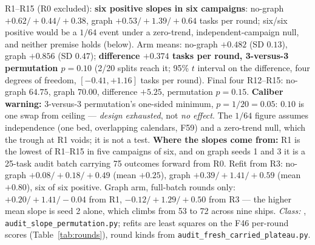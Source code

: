 \begin{description}[leftmargin=0pt,labelindent=0pt,labelsep=0pt,style=nextline,font=\normalfont,itemsep=6pt]
\item[\textbf{F47}\quad Exploratory within-campaign trend --- both arms climb.]
R1--R15 (R0 excluded): \textbf{six positive slopes in six campaigns}:
no-graph $+0.62 / +0.44 / +0.38$, graph $+0.53 / +1.39 / +0.64$ tasks
per round; six/six positive would be a $1/64$ event under a zero-trend,
independent-campaign null, and neither premise holds (below). Arm means: no-graph $+0.482$ (SD $0.13$), graph
$+0.856$ (SD $0.47$); \textbf{difference $+0.374$ tasks per round,
3-versus-3 permutation $p = 0.10$} (2/20 splits reach it; 95\% $t$
interval on the difference, four degrees of freedom, $[-0.41, +1.16]$
tasks per round). Final four
R12--R15: no-graph $64.75$, graph $70.00$, difference $+5.25$,
permutation $p = 0.15$. \textbf{Caliber warning:} 3-versus-3
permutation's one-sided minimum, $p = 1/20 = 0.05$: $0.10$ is one
swap from ceiling --- \emph{design exhausted}, not \emph{no
effect}. The $1/64$ figure assumes independence (one bed, overlapping
calendars, F59) and a zero-trend null, which the trough at R1 voids; it is
not a test. \textbf{Where the slopes come from:} R1 is the lowest of R1--R15 in five
campaigns of six, and on graph seeds 1 and 3 it is a 25-task audit batch
carrying 75 outcomes forward from R0. Refit from
R3: no-graph $+0.08/+0.18/+0.49$ (mean $+0.25$), graph $+0.39/+1.41/+0.59$
(mean $+0.80$), six of six positive. Graph arm, full-batch rounds only:
$+0.20/+1.41/-0.04$ from R1, $-0.12/+1.29/+0.50$ from R3 --- the higher
mean slope is seed 2 alone, which climbs from 53 to 72 across nine ships.
\emph{Class:} , \texttt{audit\_slope\_permutation.py}; refits are
least squares on the F46 per-round scores (Table~\ref{tab:rounds}), round
kinds from \texttt{audit\_fresh\_carried\_plateau.py}.


\end{description}
